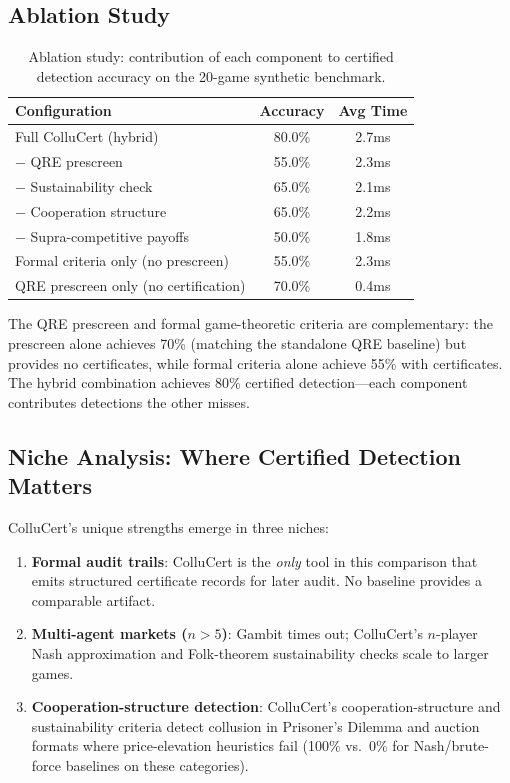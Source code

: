 \documentclass[11pt]{article}
\begin{document}
\subsection{Ablation Study}

\begin{table}[t]
\centering
\caption{Ablation study: contribution of each component to certified detection accuracy on the 20-game synthetic benchmark.}
\begin{tabular}{lcc}
\toprule
\textbf{Configuration} & \textbf{Accuracy} & \textbf{Avg Time} \\
\midrule
Full ColluCert (hybrid) & 80.0\% & 2.7ms \\
\quad $-$ QRE prescreen & 55.0\% & 2.3ms \\
\quad $-$ Sustainability check & 65.0\% & 2.1ms \\
\quad $-$ Cooperation structure & 65.0\% & 2.2ms \\
\quad $-$ Supra-competitive payoffs & 50.0\% & 1.8ms \\
Formal criteria only (no prescreen) & 55.0\% & 2.3ms \\
QRE prescreen only (no certification) & 70.0\% & 0.4ms \\
\bottomrule
\end{tabular}
\end{table}

The QRE prescreen and formal game-theoretic criteria are complementary: the prescreen alone achieves 70\% (matching the standalone QRE baseline) but provides no certificates, while formal criteria alone achieve 55\% with certificates. The hybrid combination achieves 80\% certified detection---each component contributes detections the other misses. \subsection{Niche Analysis: Where Certified Detection Matters}

ColluCert's unique strengths emerge in three niches:
\begin{enumerate}
\item \textbf{Formal audit trails}: ColluCert is the \emph{only} tool in this comparison that emits structured certificate records for later audit. No baseline provides a comparable artifact.
\item \textbf{Multi-agent markets ($n > 5$)}: Gambit times out; ColluCert's $n$-player Nash approximation and Folk-theorem sustainability checks scale to larger games.
\item \textbf{Cooperation-structure detection}: ColluCert's cooperation-structure and sustainability criteria detect collusion in Prisoner's Dilemma and auction formats where price-elevation heuristics fail (100\% vs.\ 0\% for Nash/brute-force baselines on these categories).
\end{enumerate}
\end{document}
